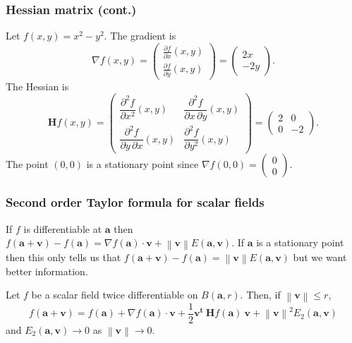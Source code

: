 \documentclass[aspectratio=169,handout]{beamer}
\newcommand{\norm}[1]{\left\|#1\right\|} %
\renewcommand{\aa}{\mathbf{a}}
\newcommand{\vv}{\mathbf{v}}
\begin{document}
\begin{frame}
    \frametitle{Hessian matrix (cont.)}

    \begin{example}
        Let \(f(x,y)=x^2-y^2\).
        The gradient is
        \[\nabla f(x,y) =\begin{pmatrix}
                \frac{\partial f}{\partial x} (x,y) \\[2.2ex]
                \frac{\partial f}{\partial y} (x,y)
            \end{pmatrix} =   \begin{pmatrix}
                2x \\-2y
            \end{pmatrix}.
        \]
        The Hessian is
        \[
            \mathbf{H} f (x,y)= \begin{pmatrix}
                \dfrac{\partial^2 f}{\partial x^2} (x,y)
                 & \dfrac{\partial^2 f}{\partial x\,\partial y} (x,y)
                \\[2.2ex]
                \dfrac{\partial^2 f}{\partial y\,\partial x} (x,y)
                 & \dfrac{\partial^2 f}{\partial y^2}(x,y)
            \end{pmatrix}
            = \begin{pmatrix}
                2
                 & 0
                \\[2.2ex]
                0
                 & -2
            \end{pmatrix}.
        \]
        The point \((0,0)\) is a stationary point since \(\nabla f(0,0) =\left(\begin{smallmatrix}
                0\\0
            \end{smallmatrix}\right) \).
    \end{example}

\end{frame}

\begin{frame}
    \frametitle{Second order Taylor formula for scalar fields}

    If \(f\) is differentiable at \(\aa\)
    then
    \(  f(\aa+  \vv) - f(\aa)  = \nabla f(\aa) \cdot \vv + \norm{\vv}E(\aa,\vv)\).
    If \(\aa\) is a stationary point then this only tells us that \(  f(\aa+  \vv) - f(\aa)  =  \norm{\vv}E(\aa,\vv)\) but we want better information.

    \begin{theorem}
        Let \(f\) be a scalar field twice differentiable on \(B(\aa,r)\).
        Then, if \(\norm{\vv}\leq r\),
        \[
            f(\aa+\vv) = f(\aa) + \nabla f(\aa) \cdot \vv + \frac{1}{2} \vv^{\mathbf{t}} \ \mathbf{H} f (\aa) \ \vv + \norm{\vv}^2 E_2(\aa,\vv)
        \]
        and \(E_2(\aa,\vv) \to 0\) as \(\norm{\vv}\to 0\).
    \end{theorem}

\end{frame}
\end{document}
